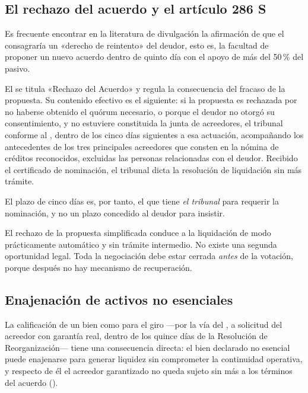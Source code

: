 \subsection{El rechazo del acuerdo y el artículo 286 S}

\begin{alerta}
Es frecuente encontrar en la literatura de divulgación la afirmación de que el
 consagraría un «derecho de reintento» del deudor, esto es, la facultad de
proponer un nuevo acuerdo dentro de quinto día con el apoyo de más del 50\,\% del pasivo.
\end{alerta}

El  se titula «Rechazo del Acuerdo» y regula la consecuencia del fracaso de la
propuesta. Su contenido efectivo es el siguiente: si la propuesta es rechazada por no
haberse obtenido el quórum necesario, o porque el deudor no otorgó su consentimiento, y
no estuviere constituida la junta de acreedores, el tribunal  conforme al , dentro de los cinco
días siguientes a esa actuación, acompañando los antecedentes de los tres principales
acreedores que consten en la nómina de créditos reconocidos, excluidas las personas
relacionadas con el deudor. Recibido el certificado de nominación, el tribunal dicta la
resolución de liquidación sin más trámite.

El plazo de cinco días es, por tanto, el que tiene \emph{el tribunal} para requerir la
nominación, y no un plazo concedido al deudor para insistir.

\begin{foco}
El rechazo de la propuesta simplificada conduce a la liquidación de modo prácticamente
automático y sin trámite intermedio. No existe una segunda oportunidad legal. Toda la
negociación debe estar cerrada \emph{antes} de la votación, porque después no hay
mecanismo de recuperación.
\end{foco}

\subsection{Enajenación de activos no esenciales}

La calificación de un bien como  para el giro ---por la vía del ,
a solicitud del acreedor con garantía real, dentro de los quince días de la Resolución de
Reorganización--- tiene una consecuencia directa: el bien declarado no esencial puede
enajenarse para generar liquidez sin comprometer la continuidad operativa, y respecto de él el
acreedor garantizado no queda sujeto sin más a los términos del acuerdo ().

